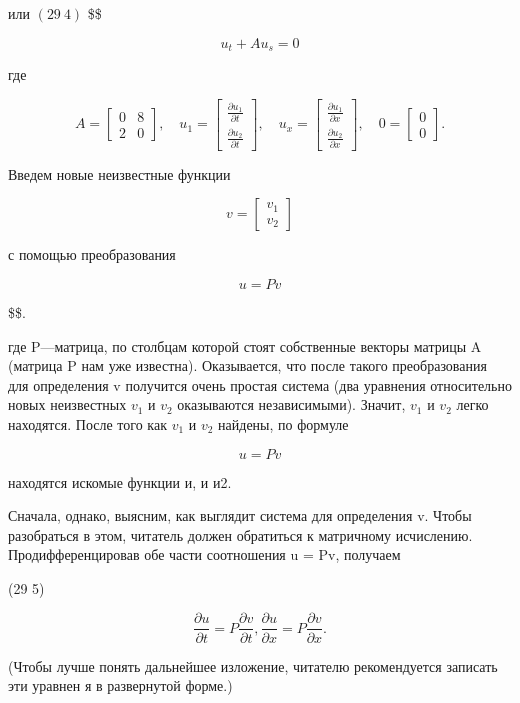 \documentclass[
  ukrainian,
]{article}
\begin{document}
или \((29 \ 4)\) \$\$

\[
u_t + Au_s = 0
\]

где

\[
A = \begin{bmatrix} 0 & 8 \\ 2 & 0 \end{bmatrix}, \quad u_1 = \begin{bmatrix} \frac{\partial u_1}{\partial t} \\ \frac{\partial u_2}{\partial t} \end{bmatrix}, \quad u_x = \begin{bmatrix} \frac{\partial u_1}{\partial x} \\ \frac{\partial u_2}{\partial x} \end{bmatrix}, \quad 0 = \begin{bmatrix} 0 \\ 0 \end{bmatrix}.
\]

Введем новые неизвестные функции

\[
v = \begin{bmatrix} v_1 \\ v_2 \end{bmatrix}
\]

с помощью преобразования

\[
u = Pv
\]

\$\$.

где P---матрица, по столбцам которой стоят собственные векторы матрицы A
(матрица P нам уже известна). Оказывается, что после такого
преобразования для определения v получится очень простая система (два
уравнения относительно новых неизвестных \(v_1\) и \(v_2\) оказываются
независимыми). Значит, \(v_1\) и \(v_2\) легко находятся. После того как
\(v_1\) и \(v_2\) найдены, по формуле

\[
u = Pv
\]

находятся искомые функции и, и и2.

Сначала, однако, выясним, как выглядит система для определения v. Чтобы
разобраться в этом, читатель должен обратиться к матричному исчислению.
Продифференцировав обе части соотношения u = Pv, получаем

(29 5)

\[
\frac{\partial u}{\partial t} = P \frac{\partial v}{\partial t},
\frac{\partial u}{\partial x} = P \frac{\partial v}{\partial x}.
\]

(Чтобы лучше понять дальнейшее изложение, читателю рекомендуется
записать эти уравнен я в развернутой форме.)
\end{document}
